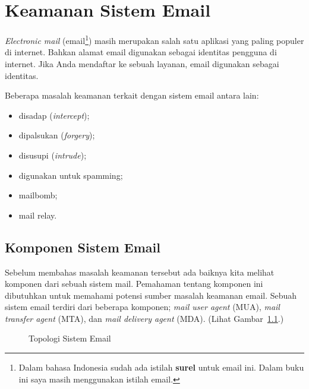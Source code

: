 \chapter{Keamanan Sistem Email}

{\em Electronic mail} (email\footnote{Dalam bahasa Indonesia sudah ada istilah
{\bf surel} untuk email ini. Dalam buku ini saya masih menggunakan istilah
email.}) masih merupakan salah satu aplikasi yang paling populer di internet.
Bahkan alamat email digunakan sebagai identitas pengguna di internet. Jika Anda
mendaftar ke sebuah layanan, email digunakan sebagai identitas.

Beberapa masalah keamanan terkait dengan sistem email antara lain:
\begin{itemize}
\item disadap ({\em intercept});
\item dipalsukan ({\em forgery});
\item disusupi ({\em intrude});
\item digunakan untuk spamming;
\item mailbomb;
\item mail relay.
\end{itemize}

\section{Komponen Sistem Email}
Sebelum membahas masalah keamanan tersebut ada baiknya kita melihat komponen
dari sebuah sistem mail. Pemahaman tentang komponen ini dibutuhkan untuk
memahami potensi sumber masalah keamanan email.
Sebuah sistem email terdiri dari beberapa komponen;
{\em mail user agent} (MUA),
{\em mail transfer agent} (MTA), dan
{\em mail delivery agent} (MDA).
(Lihat Gambar~\ref{fig:email-topologi}.)

\begin{figure}[ht]
\caption{Topologi Sistem Email}
\label{fig:email-topologi}
\end{figure}

